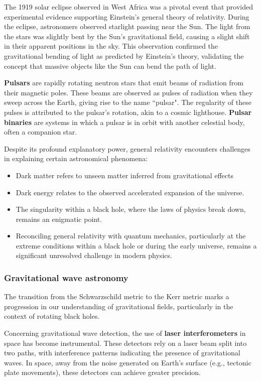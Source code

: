 \documentclass[12pt,a4paper]{article}
\begin{document}
The 1919 solar eclipse observed in West Africa was a pivotal event that provided experimental evidence supporting Einstein's general theory of relativity. During the eclipse, astronomers observed starlight passing near the Sun. The light from the stars was slightly bent by the Sun's gravitational field, causing a slight shift in their apparent positions in the sky. This observation confirmed the gravitational bending of light as predicted by Einstein's theory, validating the concept that massive objects like the Sun can bend the path of light.

\textbf{Pulsars} are rapidly rotating neutron stars that emit beams of radiation from their magnetic poles. These beams are observed as pulses of radiation when they sweep across the Earth, giving rise to the name ``pulsar". The regularity of these pulses is attributed to the pulsar's rotation, akin to a cosmic lighthouse. \textbf{Pulsar binaries} are systems in which a pulsar is in orbit with another celestial body, often a companion star.

Despite its profound explanatory power, general relativity encounters challenges in explaining certain astronomical phenomena:
\begin{itemize}
\item Dark matter refers to unseen matter inferred from gravitational effects
\item Dark energy relates to the observed accelerated expansion of the universe.
\item The singularity within a black hole, where the laws of physics break down, remains an enigmatic point. 
\item Reconciling general relativity with quantum mechanics, particularly at the extreme conditions within a black hole or during the early universe, remains a significant unresolved challenge in modern physics.
\end{itemize}

\subsubsection{Gravitational wave astronomy}
The transition from the Schwarzschild metric to the Kerr metric marks a progression in our understanding of gravitational fields, particularly in the context of rotating black holes.

Concerning gravitational wave detection, the use of \textbf{laser interferometers} in space has become instrumental. These detectors rely on a laser beam split into two paths, with interference patterns indicating the presence of gravitational waves. In space, away from the noise generated on Earth's surface (e.g., tectonic plate movements), these detectors can achieve greater precision.
\end{document}
